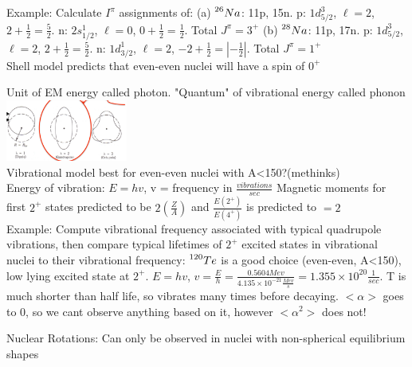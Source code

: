 \documentclass{article}
\begin{document}
\begin{multicols}{3}
Example: Calculate $I^{\pi}$ assignments of: (a) $ \prescript{26}{}{Na} $: 11p, 15n.  p: $1d_{5/2}^{3}$, $\ell = 2$, $2 + \frac{1}{2} = \frac{5}{2}$. n: $2s_{1/2}^{1}$, $\ell = 0$, $0 + \frac{1}{2} = \frac{1}{2	}$.  Total $J^{\pi} = 3^{+}$ (b)  $ \prescript{28}{}{Na} $: 11p, 17n.  p: $1d_{5/2}^{3}$, $\ell = 2$, $2 + \frac{1}{2} = \frac{5}{2}$. n: $1d_{3/2}^{1}$, $\ell = 2$, $-2 + \frac{1}{2} = |-\frac{1}{2}|$.  Total $J^{\pi} = 1^{+}$ \\
Shell model predicts that even-even nuclei will have a spin of $0^{+}$

Unit of EM energy called photon.  "Quantum" of vibrational energy called phonon\\
\includegraphics[width=4cm]{vibrations.jpg}\\
Vibrational model best for even-even nuclei with A<150?(methinks)\\
Energy of vibration: $E = hv$, v = frequency in $\frac{vibrations}{sec}$
Magnetic moments for first $2^{+}$ states predicted to be $2(\frac{Z}{A})$ and $\frac{E(2^{+})}{E(4^{+})}$ is predicted to $=2$ \\
Example:  Compute vibrational frequency associated with typical quadrupole vibrations, then compare typical lifetimes of $2^{+}$ excited states in vibrational nuclei to their vibrational frequency:  $\prescript{120}{}{Te}$ is a good choice (even-even, A<150), low lying excited state at $2^{+}$.  $E = hv$, $v = \frac{E}{h} = \frac{0.5604Mev}{4.135\times10^{-21}\frac{Mev}{s}} = 1.355\times10^{20}\frac{1}{sec}$.  T is much shorter than half life, so vibrates many times before decaying. $<\alpha>$ goes to 0, so we cant observe anything based on it, however $<\alpha^{2}>$ does not!

Nuclear Rotations:  Can only be observed in nuclei with non-spherical equilibrium shapes


\end{multicols}
\end{document}
